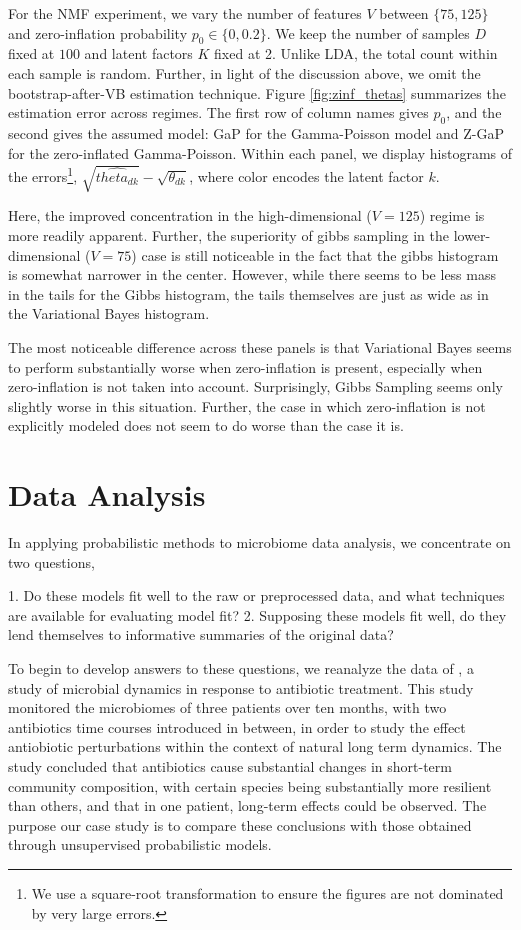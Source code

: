 \documentclass[oupdraft]{bio}
\begin{document}
For the NMF experiment, we vary the number of features $V$ between $\{75, 125\}$
and zero-inflation probability $p_{0} \in \{0, 0.2\}$. We keep the number of samples
$D$ fixed at $100$ and latent factors $K$ fixed at 2. Unlike LDA, the total
count within each sample is random. Further, in light of the discussion above,
we omit the bootstrap-after-VB estimation technique. Figure
\ref{fig:zinf_thetas} summarizes the estimation error across regimes. The first
row of column names gives $p_{0}$, and the second gives the assumed model: GaP
for the Gamma-Poisson model and Z-GaP for the zero-inflated Gamma-Poisson.
Within each panel, we display histograms of the errors\footnote{We use a
  square-root transformation to ensure the figures are not dominated by very
  large errors.}, $\sqrt{\hat{theta_{dk}}} - \sqrt{\theta_{dk}}$, where color
encodes the latent factor $k$.

Here, the improved concentration in the high-dimensional ($V = 125$) regime is
more readily apparent. Further, the superiority of gibbs sampling in the
lower-dimensional ($V = 75$) case is still noticeable in the fact that the gibbs
histogram is somewhat narrower in the center. However, while there seems to be
less mass in the tails for the Gibbs histogram, the tails themselves are just as
wide as in the Variational Bayes histogram. 

The most noticeable difference across these panels is that Variational Bayes
seems to perform substantially worse when zero-inflation is present, especially
when zero-inflation is not taken into account. Surprisingly, Gibbs Sampling
seems only slightly worse in this situation. Further, the case in which
zero-inflation is not explicitly modeled does not seem to do worse than the case
it is.

\section{Data Analysis}

In applying probabilistic methods to microbiome data analysis, we concentrate on
two questions,

1. Do these models fit well to the raw or preprocessed data, and what techniques
are available for evaluating model fit?
2. Supposing these models fit well, do they lend themselves to informative
summaries of the original data?

To begin to develop answers to these questions, we reanalyze the data of
\cite{dethlefsen2011incomplete}, a study of microbial dynamics in response to
antibiotic treatment. This study monitored the microbiomes of three patients
over ten months, with two antibiotics time courses introduced in between, in
order to study the effect antiobiotic perturbations within the context of
natural long term dynamics. The study concluded that antibiotics cause
substantial changes in short-term community composition, with certain species
being substantially more resilient than others, and that in one patient,
long-term effects could be observed. The purpose our case study is to compare
these conclusions with those obtained through unsupervised probabilistic models.
\end{document}
